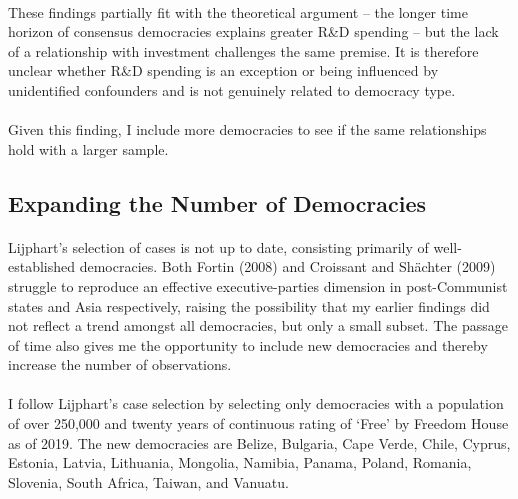 \documentclass[11pt, oneside]{article}   	%
\let\oldparagraph\paragraph
\renewcommand{\paragraph}[1]{\oldparagraph{#1}\mbox{}}
\begin{document}
\paragraph{}
These findings partially fit with the theoretical argument – the longer time horizon of consensus democracies explains greater R\&D spending – but the lack of a relationship with investment challenges the same premise. It is therefore unclear whether R\&D spending is an exception or being influenced by unidentified confounders and is not genuinely related to democracy type. 

\paragraph{}
Given this finding, I include more democracies to see if the same relationships hold with a larger sample.

\subsection{Expanding the Number of Democracies}

\paragraph{}
Lijphart’s selection of cases is not up to date, consisting primarily of well-established democracies. Both Fortin (2008) and Croissant and Shächter (2009) struggle to reproduce an effective executive-parties dimension in post-Communist states and Asia respectively, raising the possibility that my earlier findings did not reflect a trend amongst all democracies, but only a small subset. The passage of time also gives me the opportunity to include new democracies and thereby increase the number of observations.

\paragraph{}
I follow Lijphart’s case selection by selecting only democracies with a population of over 250,000 and twenty years of continuous rating of ‘Free’ by Freedom House as of 2019. The new democracies are Belize, Bulgaria, Cape Verde, Chile, Cyprus, Estonia, Latvia, Lithuania, Mongolia, Namibia, Panama, Poland, Romania, Slovenia, South Africa, Taiwan, and Vanuatu.
\end{document}
